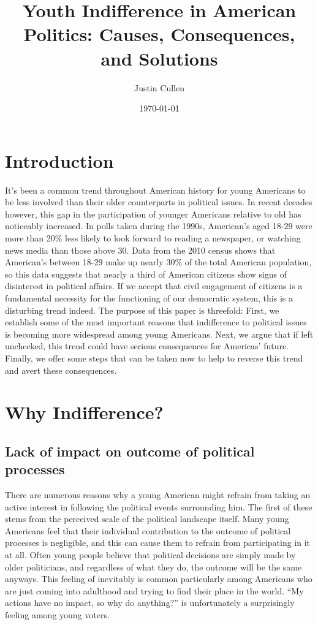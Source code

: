 \documentclass[12pt,letterpaper]{article}
\begin{document}
\title{Youth Indifference in American Politics: Causes, Consequences,
and Solutions}
\author{Justin Cullen}
\date{\today}
\maketitle

\section{Introduction} %
\label{sec:Introduction}
It's been a common trend throughout American history for young
Americans to be less involved than their older counterparts in
political issues.  In recent decades however, this gap in the
participation of younger Americans relative to old has noticeably
increased. In polls taken during the 1990s, American's aged 18-29 were
more than 20\% less likely to look forward to reading a newspaper, or
watching news media than those above 30. Data from the 2010 census
shows that American's between 18-29 make up nearly 30\% of the total
American population, so this data suggests that nearly a third of
American citizens show signs of disinterest in political affairs.  If
we accept that civil engagement of citizens is a fundamental necessity
for the functioning of our democratic system, this is a disturbing
trend indeed.  The purpose of this paper is threefold: First, we
establish some of the most important reasons that indifference to
political issues is becoming more widespread among young Americans.
Next, we argue that if left unchecked, this trend could have serious
consequences for Americas' future.  Finally, we offer some steps that
can be taken now to help to reverse this trend and avert these
consequences.

\section{Why Indifference?} %
\label{sec:Why Indifference?}
\subsection{Lack of impact on outcome of political processes}
There are numerous reasons why a young American might refrain from
taking an active interest in following the political events
surrounding him.  The first of these stems from the perceived scale of
the political landscape itself.  Many young Americans feel that their
individual contribution to the outcome of political processes is
negligible, and this can cause them to refrain from participating
in it at all.  Often young people believe that political decisions are
simply made by older politicians, and regardless of what they do, the
outcome will be the same anyways.  This feeling of inevitably is
common particularly among Americans who are just coming into adulthood
and trying to find their place in the world. ``My actions have no
impact, so why do anything?'' is unfortunately a surprisingly feeling
among young voters.
\end{document}
